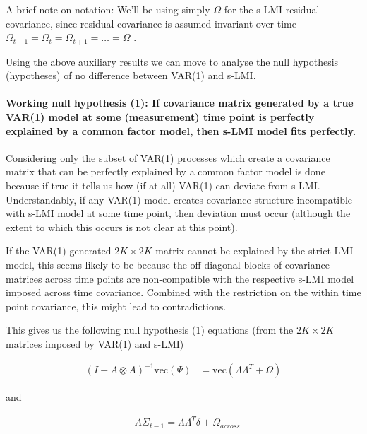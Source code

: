 \documentclass[
  letterpaper,
  DIV=11,
  numbers=noendperiod]{scrartcl}
\let\oldparagraph\paragraph
\renewcommand{\paragraph}[1]{\oldparagraph{#1}\mbox{}}
\begin{document}
A brief note on notation: We'll be using simply \(\Omega\) for the s-LMI
residual covariance, since residual covariance is assumed invariant over
time \(\Omega_{t-1}=\Omega_{t}=\Omega_{t+1}=…=\Omega\) .

Using the above auxiliary results we can move to analyse the null
hypothesis (hypotheses) of no difference between VAR(1) and s-LMI.

\hypertarget{working-null-hypothesis-1-if-covariance-matrix-generated-by-a-true-var1-model-at-some-measurement-time-point-is-perfectly-explained-by-a-common-factor-model-then-s-lmi-model-fits-perfectly.}{%
\paragraph{Working null hypothesis (1): If covariance matrix generated
by a true VAR(1) model at some (measurement) time point is perfectly
explained by a common factor model, then s-LMI model fits
perfectly.}\label{working-null-hypothesis-1-if-covariance-matrix-generated-by-a-true-var1-model-at-some-measurement-time-point-is-perfectly-explained-by-a-common-factor-model-then-s-lmi-model-fits-perfectly.}}

Considering only the subset of VAR(1) processes which create a
covariance matrix that can be perfectly explained by a common factor
model is done because if true it tells us how (if at all) VAR(1) can
deviate from s-LMI. Understandably, if any VAR(1) model creates
covariance structure incompatible with s-LMI model at some time point,
then deviation must occur (although the extent to which this occurs is
not clear at this point).

If the VAR(1) generated \(2K\times2K\) matrix cannot be explained by the
strict LMI model, this seems likely to be because the off diagonal
blocks of covariance matrices across time points are non-compatible with
the respective s-LMI model imposed across time covariance. Combined with
the restriction on the within time point covariance, this might lead to
contradictions.

This gives us the following null hypothesis (1) equations (from the
\(2K\times2K\) matrices imposed by VAR(1) and s-LMI)

\[
\begin{align*}
(I-A \otimes A)^{-1} \text{vec}(\Psi) &= \text{vec}(\Lambda \Lambda^T + \Omega)
\end{align*}
\]

and

\[
\begin{align*}
&A\Sigma_{t-1}=\Lambda\Lambda^T\delta+\Omega_{across}
\end{align*}
\]
\end{document}
